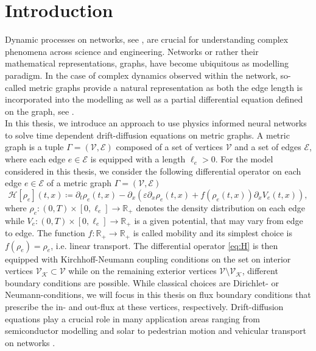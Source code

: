 \chapter{Introduction}

Dynamic processes on networks, see \cite{newman2018networks}, are crucial for understanding complex phenomena across science and engineering. Networks or rather their mathematical representations, graphs, have become ubiquitous as modelling paradigm. In the case of complex dynamics observed within the network, so-called metric graphs provide a natural representation as both the edge length is incorporated into the modelling as well as a partial differential equation defined on the graph, see \cite{BerkolaikoKuchment:2013}. \\
In this thesis, we introduce an approach to use physics informed neural networks to solve time dependent drift-diffusion equations on metric graphs. A metric graph is a tuple $\Gamma = \left(\mathcal{V},\mathcal{E}\right)$ composed of a set of vertices $\mathcal{V}$ and a set of edges $\mathcal{E}$, where each edge $e \in \mathcal{E}$ is equipped with a length $\ell_e>0$. For the model considered in this thesis, we consider the following differential operator on each edge $e \in \mathcal{E}$ of a metric graph $\Gamma = \left(\mathcal{V},\mathcal{E}\right)$
\begin{equation} 
    \label{eq:H}
    \mathcal{H} [\rho_e]  \left( t,x \right)  \coloneqq \partial_t \rho_e  \left( t,x \right)   - \partial_x  \left( \varepsilon \partial_x \rho_e  \left( t,x \right)  + f \left( \rho_e  \left( t,x \right)   \right)  \partial_x V_e  \left( t,x \right)  \right) ,
\end{equation}
where $\rho_e \colon  \left( 0, T \right)  \times \left[ 0, \ell_e \right] \to \mathbb{R}_{+}$ denotes the density distribution on each edge while $V_e \colon  \left( 0,T \right)  \times \left[ 0, \ell_e \right] \to \mathbb{R}_{+}$ is a given potential, that may vary from edge to edge. The function $f \colon \mathbb{R}_{+} \to \mathbb{R}_{+}$ is called mobility and its simplest choice is $f\left(\rho_e\right) = \rho_e$, i.e. linear transport. The differential operator \cref{eq:H} is then equipped with Kirchhoff-Neumann coupling conditions on the set on interior vertices $\mathcal{V}_\mathcal{K} \subset \mathcal{V}$ while on the remaining exterior vertices $\mathcal{V} \setminus \mathcal{V}_\mathcal{K}$, different boundary conditions are possible. While classical choices are Dirichlet- or Neumann-conditions, we will focus in this thesis on flux boundary conditions that prescribe the in- and out-flux at these vertices, respectively. Drift-diffusion equations play a crucial role in many application areas ranging from semiconductor modelling \cite{natalini1996bipolar} and solar \cite{hwang2009drift} to pedestrian motion \cite{hughes2002continuum} and vehicular transport on networks \cite{burger2018derivation,tordeux2018traffic}. \\
